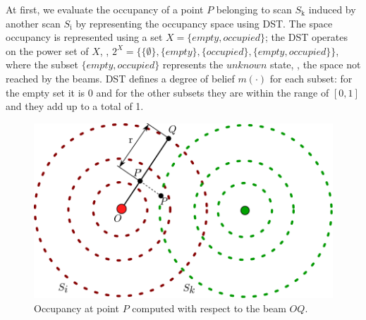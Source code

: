 At first, we evaluate the occupancy of a point $P$ belonging to scan $S_{\text{k}}$ induced by another scan $S_{\text{i}}$ by representing the occupancy space using DST.  The space occupancy is represented using a set $X = \{empty, occupied\}$; the DST operates on the power set of $X$, \ie, $2^X = \{\{\emptyset\}, \{empty\}, \{occupied\}, \{empty,occupied\}\}$, where the subset $\{empty,occupied\}$ represents the $unknown$ state, \ie, the space not reached by the beams. DST defines a degree of belief $m(\cdot)$ for each subset: for the empty set it is 0 and for the other subsets they are within the range of $[0, 1]$ and they add up to a total of 1.

\begin{figure}[t]
\centering
\includegraphics[width=0.99\columnwidth]{./img/ch-laser/scanoccupancy}
\caption{Occupancy at point $P$ computed with respect to the beam $OQ$.}
\label{fig:scanocc}
\end{figure}

